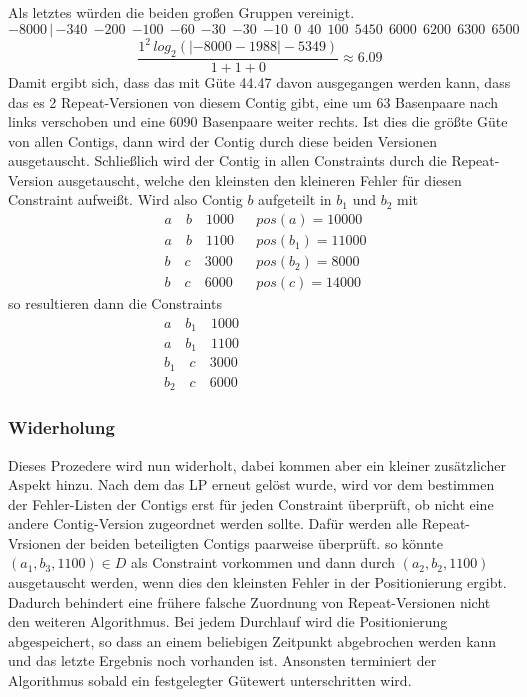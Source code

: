 \documentclass[12pt,ngerman,titlepage,a4paper]{article}
\begin{document}
Als letztes würden die beiden großen Gruppen vereinigt.
{\footnotesize \[ {-8000} \, | \, {-340} \ \ {-200} \ \ {-100} \ \ {-60} \ \ {-30} \ \ {-30} \ \ {-10} \ \ 0 \ \ 40 \ \ 100 \ \ 5450 \ \ 6000 \ \ 6200 \ \ 6300 \ \ 6500\]}
\[\frac{1^2 \, log_2( |-8000 - 1988| - 5349 )}{1 + 1 + 0 } \approx 6.09\]
Damit ergibt sich, dass das mit Güte 44.47 davon ausgegangen werden kann, dass das es 2 Repeat-Versionen von diesem Contig gibt, eine um 63 Basenpaare nach links verschoben und eine 6090 Basenpaare weiter rechts. Ist dies die größte Güte von allen Contigs, dann wird der Contig durch diese beiden Versionen ausgetauscht. Schließlich wird der Contig in allen Constraints durch die Repeat-Version ausgetauscht, welche den kleinsten den kleineren Fehler für diesen Constraint aufweißt.
Wird also Contig $b$ aufgeteilt in $b_1$ und $b_2$ mit
\begin{align*}
&a \quad b \quad 1000 &&pos(a) = 10000\\
&a \quad b \quad 1100 &&pos(b_1) = 11000\\
&b \quad c \quad 3000 &&pos(b_2) = 8000\\
&b \quad c \quad 6000 &&pos(c) = 14000
\end{align*}
so resultieren dann die Constraints
\begin{align*}
&a \quad b_1 \quad 1000 &&\phantom{pos(a) = 10000}\\
&a \quad b_1 \quad 1100\\
&b_1 \quad c \quad 3000\\
&b_2 \quad c \quad 6000
\end{align*}

\subsubsection*{Widerholung} 
Dieses Prozedere wird nun widerholt, dabei kommen aber ein kleiner zusätzlicher Aspekt hinzu.
Nach dem das LP erneut gelöst wurde, wird vor dem bestimmen der Fehler-Listen der Contigs erst für jeden Constraint überprüft,
ob nicht eine andere Contig-Version zugeordnet werden sollte.
Dafür werden alle Repeat-Vrsionen der beiden beteiligten Contigs paarweise überprüft.
so könnte $(a_1,b_3,1100) \in D$ als Constraint vorkommen und dann durch $(a_2,b_2,1100)$ ausgetauscht werden, wenn dies den kleinsten Fehler in der Positionierung ergibt. Dadurch behindert eine frühere falsche Zuordnung von Repeat-Versionen nicht den weiteren Algorithmus.
Bei jedem Durchlauf wird die Positionierung abgespeichert, so dass an einem beliebigen Zeitpunkt abgebrochen werden kann und das letzte Ergebnis noch vorhanden ist. Ansonsten terminiert der Algorithmus sobald ein festgelegter Gütewert unterschritten wird.
\end{document}
